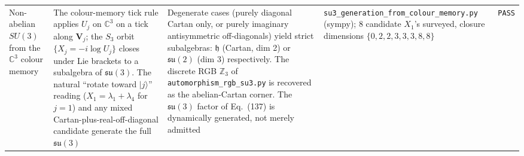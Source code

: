 {\begin{longtable}{@{}p{3.2cm}p{3.6cm}p{3.4cm}p{3.8cm}p{1.0cm}@{}}
Non-abelian $SU(3)$ from the $\mathbb{C}^3$ colour memory
    & The colour-memory tick rule applies $U_j$ on $\mathbb{C}^3$ on
      a tick along $\mathbf{V}_j$; the $S_3$ orbit $\{X_j = -i\log U_j\}$
      closes under Lie brackets to a subalgebra of $\mathfrak{su}(3)$.
      The natural ``rotate toward $|j\rangle$'' reading
      ($X_1 = \lambda_1 + \lambda_4$ for $j=1$) and any
      mixed Cartan-plus-real-off-diagonal candidate generate the
      full $\mathfrak{su}(3)$
    & Degenerate cases (purely diagonal Cartan only, or purely
      imaginary antisymmetric off-diagonals) yield strict
      subalgebras: $\mathfrak{h}$ (Cartan, dim 2) or
      $\mathfrak{su}(2)$ (dim 3) respectively.
      The discrete RGB $\mathbb{Z}_3$ of
      \nolinkurl{automorphism_rgb_su3.py} is recovered as
      the abelian-Cartan corner.  The $\mathfrak{su}(3)$ factor of
      Eq.~(137) is dynamically generated, not merely admitted
    & \nolinkurl{su3_generation_from_colour_memory.py} (sympy);
      8 candidate $X_1$'s surveyed, closure dimensions
      $\{0, 2, 2, 3, 3, 3, 8, 8\}$
    & \texttt{PASS} \\


\end{longtable}}
